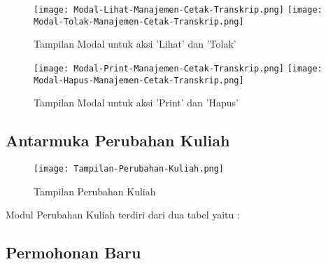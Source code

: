 \begin{figure} [H]
	\centering  
	\texttt{[image: Modal-Lihat-Manajemen-Cetak-Transkrip.png]}  
	\texttt{[image: Modal-Tolak-Manajemen-Cetak-Transkrip.png]} 
	\caption{Tampilan Modal untuk aksi 'Lihat' dan 'Tolak'} 	
\end{figure}

\begin{figure} [H]
	\centering  
	\texttt{[image: Modal-Print-Manajemen-Cetak-Transkrip.png]}  
	\texttt{[image: Modal-Hapus-Manajemen-Cetak-Transkrip.png]} 
	\caption{Tampilan Modal untuk aksi 'Print' dan 'Hapus'} 	
\end{figure}


\subsection{Antarmuka Perubahan Kuliah}
\begin{figure} [H]
	\centering  
	\texttt{[image: Tampilan-Perubahan-Kuliah.png]}  
	\caption{Tampilan Perubahan Kuliah} 
\end{figure}
Modul Perubahan Kuliah terdiri dari dua tabel yaitu :

\subsection{Permohonan Baru}

